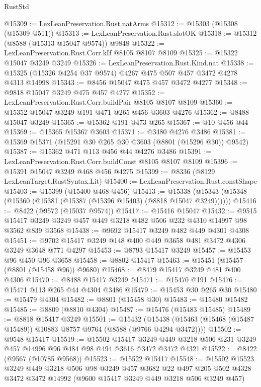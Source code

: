 \begin{lexlean}{RustStd}
\begin{coremodule}
@15309 := LexLeanPreservation.Rust.natArms
@15312 := @15303 (@15308 (@15309 @511))
@15313 := LexLeanPreservation.Rust.slotOK
@15318 := @15312 (@8588 (@15313 @15047 @9574)) @9848
@15322 := LexLeanPreservation.Rust.Corr.kIf @8105 @8107 @8109
@15325 := @15322 @15047 @3249 @3249
@15326 := LexLeanPreservation.Rust.Kind.nat
@15338 := @15325 (@15326 @4254 @37 @9574) @4267 @475 @507 @457 @3472 @4278 @4313 @14998
@15343 := @8456 @15047 @475 @457 @3472 @4277
@15348 := @9818 @15047 @3249 @475 @457 @4277
@15352 := LexLeanPreservation.Rust.Corr.buildPair @8105 @8107 @8109
@15360 := @15352 @15047 @3249 @191 @471 @265 @456 @3603 @4276
@15362 := @8488 @15047 @3249
@15365 := @15362 @191 @473 @265
@15367 := @10 @456 @44
@15369 := @15365 @15367 @3603
@15371 := @3480 @4276 @3486
@15381 := @15369 @15371 (@15291 @30 @265 @30 @3603 (@8801 (@15296 @30)) @9542)
@15387 := @15362 @471 @113 @456 @44 @4276 @3486
@15391 := LexLeanPreservation.Rust.Corr.buildConst @8105 @8107 @8109
@15396 := @15391 @15047 @3249 @468 @456 @4275
@15399 := @8336 (@8129 LexLeanTarget.RustSyntax.Lit)
@15400 := LexLeanPreservation.Rust.constShape
@15403 := @15399 (@15400 @468 @456)
@15413 := @15338 (@15343 (@15348 (@15360 (@15381 (@15387 (@15396 @15403) (@8818 @15047 @3249))))))
@15416 := @8422 (@9572 (@15037 @9574))
@15417 := @15416 @15047
@15432 := @9515 @15417 @3249 @3249 @457 @449 @3218 @482 @506 @232 @4310 @14997 @98 @3562 @839 @3568
@15438 := @9692 @15417 @3249 @482 @449 @4301 @4308
@15451 := @9702 @15417 @3249 @148 @400 @449 @3658 @481 @3472 @4306 @3249 @3648 @771 @4297
@15453 := @8793 @15417 @3249
@15457 := @15453 @96 @450 @96 @3658
@15458 := @8802 @15417
@15463 := @15451 (@15457 (@8801 (@15458 @96)) @9680)
@15468 := @8479 @15417 @3249 @481 @400 @4306
@15470 := @8488 @15417 @3249
@15471 := @15470 @191
@15476 := @15471 @113 @265 @44 @4304 @3486
@15479 := @15453 @30 @265 @30
@15480 := @15479 @4304
@15482 := @8801 (@15458 @30)
@15483 := @15480 @15482
@15485 := @8809 (@8810 @4304)
@15487 := @15476 (@15483 @15485)
@15489 := @8818 @15417 @3249
@15501 := @15432
    (@15438 (@15463 (@15468 (@15487 @15489)) @10883 @8757 @9764 (@8588 (@9766 @4294 @3472))))
@15502 := @9548 @15417
@15519 := @15502
    @15417
    @3249
    @449
    @3218
    @506
    @231
    @3249
    @457
    @14996
    @96
    @484
    @98
    @494
    @3616
    @3472
    @3472
    @4321
@15522 := @8422 (@9567 (@10785 @9568))
@15523 := @15522 @15417
@15548 := @15502
    @15523
    @3249
    @449
    @3218
    @506
    @98
    @3249
    @457
    @3682
    @22
    @497
    @205
    @502
    @4328
    @3472
    @3472
    @14992
    (@9600 @15417 @3249 @449 @3218 @506 @3249 @457)

\end{coremodule}
\end{lexlean}
